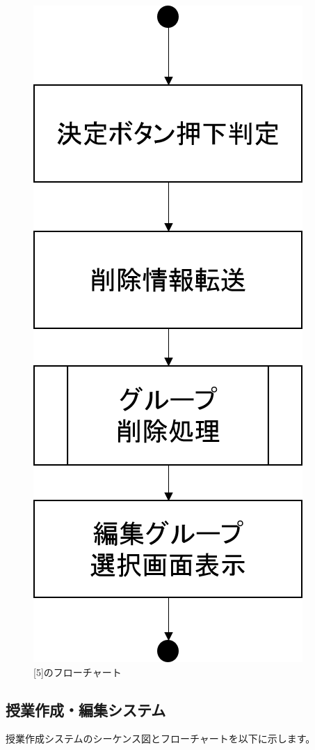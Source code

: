 \begin{figure}[htbp]
  \begin{center}
    \includegraphics[width=0.5\linewidth,clip]{./img/edit_group/sub5.png}
    \caption{[5]のフローチャート}\label{fig:editgroupflow1}
  \end{center}
\end{figure}


\newpage
\subsection{授業作成・編集システム}
授業作成システムのシーケンス図とフローチャートを以下に示します。


